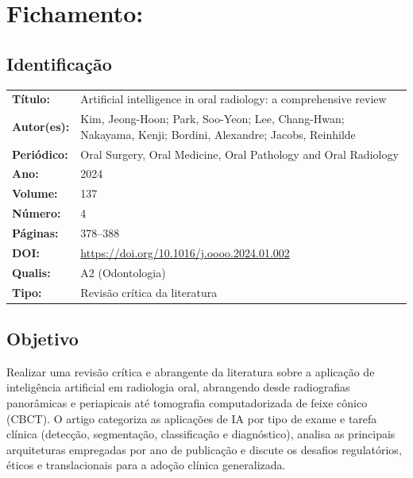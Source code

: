 \section{Fichamento: }

\subsection{Identificação}
\begin{tabular}{ll}
\textbf{Título:} & Artificial intelligence in oral radiology: a comprehensive
review \\
\textbf{Autor(es):} & Kim, Jeong-Hoon; Park, Soo-Yeon; Lee, Chang-Hwan;
Nakayama, Kenji; Bordini, Alexandre; Jacobs, Reinhilde \\
\textbf{Periódico:} & Oral Surgery, Oral Medicine, Oral Pathology and Oral Radiology \\
\textbf{Ano:} & 2024 \\
\textbf{Volume:} & 137 \\
\textbf{Número:} & 4 \\
\textbf{Páginas:} & 378--388 \\
\textbf{DOI:} & \url{https://doi.org/10.1016/j.oooo.2024.01.002} \\
\textbf{Qualis:} & A2 (Odontologia) \\
\textbf{Tipo:} & Revisão crítica da literatura \\
\end{tabular}

\subsection{Objetivo}
Realizar uma revisão crítica e abrangente da literatura sobre a aplicação
de inteligência artificial em radiologia oral, abrangendo desde radiografias
panorâmicas e periapicais até tomografia computadorizada de feixe cônico
(CBCT). O artigo categoriza as aplicações de IA por tipo de exame e tarefa
clínica (detecção, segmentação, classificação e diagnóstico), analisa as
principais arquiteturas empregadas por ano de publicação e discute os
desafios regulatórios, éticos e translacionais para a adoção clínica
generalizada.


